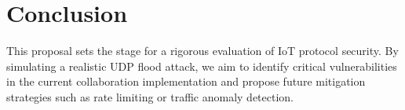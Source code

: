 \documentclass[conference]{IEEEtran}
\begin{document}
\section{Conclusion}
This proposal sets the stage for a rigorous evaluation of IoT protocol security. By simulating a realistic UDP flood attack, we aim to identify critical vulnerabilities in the current collaboration implementation and propose future mitigation strategies such as rate limiting or traffic anomaly detection.
\end{document}
